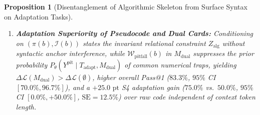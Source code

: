 \documentclass[10pt,twocolumn]{article}
\newtheorem{proposition}{Proposition}
\begin{document}
\begin{proposition}[Disentanglement of Algorithmic Skeleton from Surface Syntax on Adaptation Tasks]
\begin{enumerate}
    \item \textbf{Adaptation Superiority of Pseudocode and Dual Cards:} Conditioning on $(\pi(b), \mathcal{I}(b))$ states the invariant relational constraint $Z_{\text{alg}}$ without syntactic anchor interference, while $\mathcal{W}_{\text{pitfall}}(b)$ in $M_{\text{dual}}$ suppresses the prior probability $P_\theta(Y^{\text{pit}} \mid T_{\text{adapt}}, M_{\text{dual}})$ of common numerical traps, yielding $\Delta \mathcal{L}(M_{\text{dual}}) > \Delta \mathcal{L}(\emptyset)$, higher overall Pass@1 ($83.3\%$, $95\%$ CI $[70.0\%, 96.7\%]$), and a $+25.0\text{ pt}$ S4 adaptation gain ($75.0\%$ vs.\ $50.0\%$, $95\%$ CI $[0.0\%, +50.0\%]$, $\text{SE} = 12.5\%$) over raw code independent of context token length.
\end{enumerate}
\end{proposition}
\end{document}
